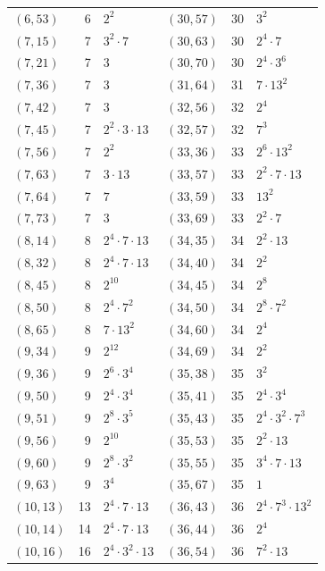 \documentclass[11pt]{article}
\begin{document}
\begin{longtable}{@{}lrl@{\qquad}lrl@{}}
$(6,53)$ & 6 & $2^{2}$ & $(30,57)$ & 30 & $3^{2}$\\
$(7,15)$ & 7 & $3^{2}\cdot 7$ & $(30,63)$ & 30 & $2^{4}\cdot 7$\\
$(7,21)$ & 7 & $3$ & $(30,70)$ & 30 & $2^{4}\cdot 3^{6}$\\
$(7,36)$ & 7 & $3$ & $(31,64)$ & 31 & $7\cdot 13^{2}$\\
$(7,42)$ & 7 & $3$ & $(32,56)$ & 32 & $2^{4}$\\
$(7,45)$ & 7 & $2^{2}\cdot 3\cdot 13$ & $(32,57)$ & 32 & $7^{3}$\\
$(7,56)$ & 7 & $2^{2}$ & $(33,36)$ & 33 & $2^{6}\cdot 13^{2}$\\
$(7,63)$ & 7 & $3\cdot 13$ & $(33,57)$ & 33 & $2^{2}\cdot 7\cdot 13$\\
$(7,64)$ & 7 & $7$ & $(33,59)$ & 33 & $13^{2}$\\
$(7,73)$ & 7 & $3$ & $(33,69)$ & 33 & $2^{2}\cdot 7$\\
$(8,14)$ & 8 & $2^{4}\cdot 7\cdot 13$ & $(34,35)$ & 34 & $2^{2}\cdot 13$\\
$(8,32)$ & 8 & $2^{4}\cdot 7\cdot 13$ & $(34,40)$ & 34 & $2^{2}$\\
$(8,45)$ & 8 & $2^{10}$ & $(34,45)$ & 34 & $2^{8}$\\
$(8,50)$ & 8 & $2^{4}\cdot 7^{2}$ & $(34,50)$ & 34 & $2^{8}\cdot 7^{2}$\\
$(8,65)$ & 8 & $7\cdot 13^{2}$ & $(34,60)$ & 34 & $2^{4}$\\
$(9,34)$ & 9 & $2^{12}$ & $(34,69)$ & 34 & $2^{2}$\\
$(9,36)$ & 9 & $2^{6}\cdot 3^{4}$ & $(35,38)$ & 35 & $3^{2}$\\
$(9,50)$ & 9 & $2^{4}\cdot 3^{4}$ & $(35,41)$ & 35 & $2^{4}\cdot 3^{4}$\\
$(9,51)$ & 9 & $2^{8}\cdot 3^{5}$ & $(35,43)$ & 35 & $2^{4}\cdot 3^{2}\cdot 7^{3}$\\
$(9,56)$ & 9 & $2^{10}$ & $(35,53)$ & 35 & $2^{2}\cdot 13$\\
$(9,60)$ & 9 & $2^{8}\cdot 3^{2}$ & $(35,55)$ & 35 & $3^{4}\cdot 7\cdot 13$\\
$(9,63)$ & 9 & $3^{4}$ & $(35,67)$ & 35 & $1$\\
$(10,13)$ & 13 & $2^{4}\cdot 7\cdot 13$ & $(36,43)$ & 36 & $2^{4}\cdot 7^{3}\cdot 13^{2}$\\
$(10,14)$ & 14 & $2^{4}\cdot 7\cdot 13$ & $(36,44)$ & 36 & $2^{4}$\\
$(10,16)$ & 16 & $2^{4}\cdot 3^{2}\cdot 13$ & $(36,54)$ & 36 & $7^{2}\cdot 13$\\

\end{longtable}
\end{document}
